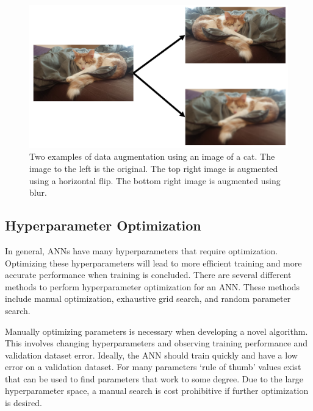\begin{figure}[H]
	\centering
	\includegraphics[width=0.9\linewidth]{images/cat}
	\caption{Two examples of data augmentation using an image of a cat. The image to the left is the original. The top right image is augmented using a horizontal flip. The bottom right image is augmented using blur.}
	\label{fig:cat}
\end{figure}

\subsection{Hyperparameter Optimization}

In general, ANNs have many hyperparameters that require optimization. Optimizing these hyperparameters will lead to more efficient training and more accurate performance when training is concluded. There are several different methods to perform hyperparameter optimization for an ANN. These methods include manual optimization, exhaustive grid search, and random parameter search.

Manually optimizing parameters is necessary when developing a novel algorithm. This involves changing hyperparameters and observing training performance and validation dataset error. Ideally, the ANN should train quickly and have a low error on a validation dataset. For many parameters `rule of thumb' values exist that can be used to find parameters that work to some degree. Due to the large hyperparameter space, a manual search is cost prohibitive if further optimization is desired.

